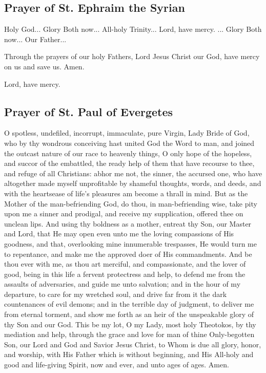 \subsection{Prayer of St. Ephraim the Syrian}




Holy God... Glory  Both now... All-holy Trinity... Lord, have mercy. ... Glory  Both now... Our Father...

Through the prayers of our holy Fathers, Lord Jesus Christ our God, have mercy on us and save us. Amen.


Lord, have mercy. 

\subsection{Prayer of St. Paul of Evergetes}

O spotless, undefiled, incorrupt, immaculate, pure Virgin, Lady Bride of God, who by thy wondrous conceiving hast united God the Word to man, and joined the outcast nature of our race to heavenly things, O only hope of the hopeless, and succor of the embattled, the ready help of them that have recourse to thee, and refuge of all Christians: abhor me not, the sinner, the accursed one, who have altogether made myself unprofitable by shameful thoughts, words, and deeds, and with the heartsease of life's pleasures am become a thrall in mind. But as the Mother of the man-befriending God, do thou, in man-befriending wise, take pity upon me a sinner and prodigal, and receive my supplication, offered thee on unclean lips. And using thy boldness as a mother, entreat thy Son, our Master and Lord, that He may open even unto me the loving compassions of His goodness, and that, overlooking mine innumerable trespasses, He would turn me to repentance, and make me the approved doer of His commandments. And be thou ever with me, as thou art merciful, and compassionate, and the lover of good, being in this life a fervent protectress and help, to defend me from the assaults of adversaries, and guide me unto salvation; and in the hour of my departure, to care for my wretched soul, and drive far from it the dark countenances of evil demons; and in the terrible day of judgment, to deliver me from eternal torment, and show me forth as an heir of the unspeakable glory of thy Son and our God. This be my lot, O my Lady, most holy Theotokos, by thy mediation and help, through the grace and love for man of thine Only-begotten Son, our Lord and God and Savior Jesus Christ, to Whom is due all glory, honor, and worship, with His Father which is without beginning, and His All-holy and good and life-giving Spirit, now and ever, and unto ages of ages. Amen.

